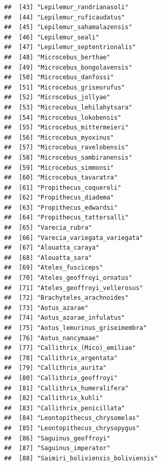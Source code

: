 \documentclass[]{article}
\begin{document}
\begin{verbatim}
##  [43] "Lepilemur_randrianasoli"                      
##  [44] "Lepilemur_ruficaudatus"                       
##  [45] "Lepilemur_sahamalazensis"                     
##  [46] "Lepilemur_seali"                              
##  [47] "Lepilemur_septentrionalis"                    
##  [48] "Microcebus_berthae"                           
##  [49] "Microcebus_bongolavensis"                     
##  [50] "Microcebus_danfossi"                          
##  [51] "Microcebus_griseorufus"                       
##  [52] "Microcebus_jollyae"                           
##  [53] "Microcebus_lehilahytsara"                     
##  [54] "Microcebus_lokobensis"                        
##  [55] "Microcebus_mittermeieri"                      
##  [56] "Microcebus_myoxinus"                          
##  [57] "Microcebus_ravelobensis"                      
##  [58] "Microcebus_sambiranensis"                     
##  [59] "Microcebus_simmonsi"                          
##  [60] "Microcebus_tavaratra"                         
##  [61] "Propithecus_coquereli"                        
##  [62] "Propithecus_diadema"                          
##  [63] "Propithecus_edwardsi"                         
##  [64] "Propithecus_tattersalli"                      
##  [65] "Varecia_rubra"                                
##  [66] "Varecia_variegata_variegata"                  
##  [67] "Alouatta_caraya"                              
##  [68] "Alouatta_sara"                                
##  [69] "Ateles_fusciceps"                             
##  [70] "Ateles_geoffroyi_ornatus"                     
##  [71] "Ateles_geoffroyi_vellerosus"                  
##  [72] "Brachyteles_arachnoides"                      
##  [73] "Aotus_azarae"                                 
##  [74] "Aotus_azarae_infulatus"                       
##  [75] "Aotus_lemurinus_griseimembra"                 
##  [76] "Aotus_nancymaae"                              
##  [77] "Callithrix_(Mico)_emiliae"                    
##  [78] "Callithrix_argentata"                         
##  [79] "Callithrix_aurita"                            
##  [80] "Callithrix_geoffroyi"                         
##  [81] "Callithrix_humeralifera"                      
##  [82] "Callithrix_kuhli"                             
##  [83] "Callithrix_penicillata"                       
##  [84] "Leontopithecus_chrysomelas"                   
##  [85] "Leontopithecus_chrysopygus"                   
##  [86] "Saguinus_geoffroyi"                           
##  [87] "Saguinus_imperator"                           
##  [88] "Saimiri_boliviensis_boliviensis"              

\end{verbatim}
\end{document}
